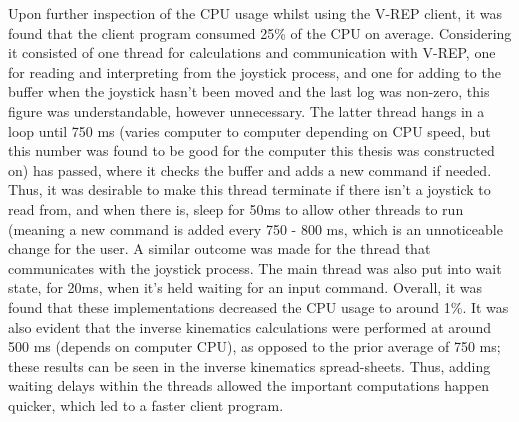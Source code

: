 \documentclass[12pt,openany,a4paper]{book}
\begin{document}
Upon further inspection of the CPU usage whilst using the V-REP client, it was found that the client program consumed 25\% of the CPU on average. Considering it consisted of one thread for calculations and communication with V-REP, one for reading and interpreting from the joystick process, and one for adding to the buffer when the joystick hasn't been moved and the last log was non-zero, this figure was understandable, however unnecessary. The latter thread hangs in a loop until 750 ms (varies computer to computer depending on CPU speed, but this number was found to be good for the computer this thesis was constructed on) has passed, where it checks the buffer and adds a new command if needed. Thus, it was desirable to make this thread terminate if there isn't a joystick to read from, and when there is, sleep for 50ms to allow other threads to run (meaning a new command is added every 750 - 800 ms, which is an unnoticeable change for the user. A similar outcome was made for the thread that communicates with the joystick process. The main thread was also put into wait state, for 20ms, when it's held waiting for an input command. Overall, it was found that these implementations decreased the CPU usage to around 1\%. It was also evident that the inverse kinematics calculations were performed at around 500 ms (depends on computer CPU), as opposed to the prior average of 750 ms; these results can be seen in the inverse kinematics spread-sheets. Thus, adding waiting delays within the threads allowed the important computations happen quicker, which led to a faster client program.
\end{document}
